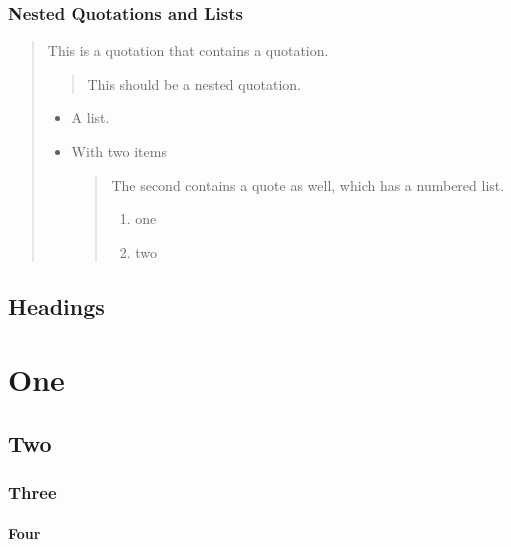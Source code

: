 \subsection{\label{nested-quotations-and-lists}Nested Quotations and Lists}
\begin{quote}
\par This is a quotation that contains a quotation.
\begin{quote}
\par This should be a nested quotation.
\end{quote}

\begin{itemize}
\item
\par A list.
\item
\par With two items
\begin{quote}
\par The second contains a quote as well, which has a numbered list.
\begin{enumerate}
\item
\par one
\item
\par two
\end{enumerate}

\end{quote}

\end{itemize}

\end{quote}

\section{\label{headings}Headings}
\chapter{\label{one}One}
\section{\label{two}Two}
\subsection{\label{three}Three}
\subsubsection{\label{four}Four}
